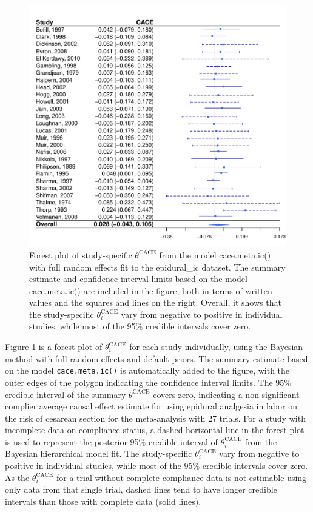 \begin{figure}

{\centering \includegraphics[width=1\linewidth,height=0.55\textheight]{forest_ic} 

}

\caption{Forest plot of study-specific $\theta^{\text{CACE}}$ from the model cace.meta.ic() with full random effects fit to the epidural\_ic dataset. The summary estimate and confidence interval limits based on the model cace.meta.ic() are included in the figure, both in terms of written values and the squares and lines on the right. Overall, it shows that the study-specific $\theta^{\text{CACE}}_i$ vary from negative to positive in individual studies, while most of the 95\% credible intervals cover zero.}\label{fig:forest}
\end{figure}

Figure \ref{fig:forest} is a forest plot of \(\theta^\text{CACE}_i\) for each study individually, using the Bayesian method with full random effects and default priors.
The summary estimate based on the model \texttt{cace.meta.ic()} is automatically added to the figure, with the outer edges of the polygon indicating the confidence interval limits.
The 95\% credible interval of the summary \(\theta^{\text{CACE}}\) covers zero, indicating a non-significant complier average causal effect estimate for using epidural analgesia in labor on the risk of cesarean section for the meta-analysis with 27 trials.
For a study with incomplete data on compliance status, a dashed horizontal line in the forest plot is used to represent the posterior 95\% credible interval of \(\theta^\text{CACE}_i\) from the Bayesian hierarchical model fit.
The study-specific \(\theta^{\text{CACE}}_i\) vary from negative to positive in individual studies, while most of the 95\% credible intervals cover zero.
As the \(\theta^\text{CACE}_i\) for a trial without complete compliance data is not estimable using only data from that single trial, dashed lines tend to have longer credible intervals than those with complete data (solid lines).

